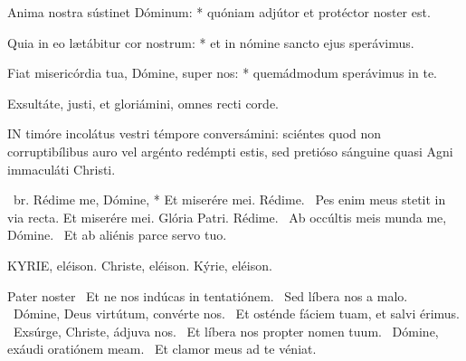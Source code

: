 Anima nostra sústinet Dóminum: * quóniam adjútor et protéctor noster est.

Quia in eo lætábitur cor nostrum: * et in nómine sancto ejus sperávimus.

Fiat misericórdia tua, Dómine, super nos: * quemádmodum sperávimus in te.

 Exsultáte, justi, et gloriámini, omnes recti corde.



\lettrine[lines=2]{I}{N} timóre incolátus vestri témpore conversámini: sciéntes quod non corruptibílibus auro vel argénto redémpti estis, sed pretióso sánguine quasi Agni immaculáti Christi.

\R\ br. Rédime me, Dómine, * Et miserére mei. Rédime. \V\ Pes enim meus stetit in via recta. Et miserére mei. Glória Patri. Rédime. \V\ Ab occúltis meis munda me, Dómine. \R\ Et ab aliénis parce servo tuo.



KYRIE, eléison. Christe, eléison. Kýrie, eléison.

Pater noster  \V\ Et ne nos indúcas in tentatiónem. \R\ Sed líbera nos a malo. \V\ Dómine, Deus virtútum, convérte nos. \R\ Et osténde fáciem tuam, et salvi érimus. \V\ Exsúrge, Christe, ádjuva nos. \R\ Et líbera nos propter nomen tuum. \V\ Dómine, exáudi oratiónem meam. \R\ Et clamor meus ad te véniat.



